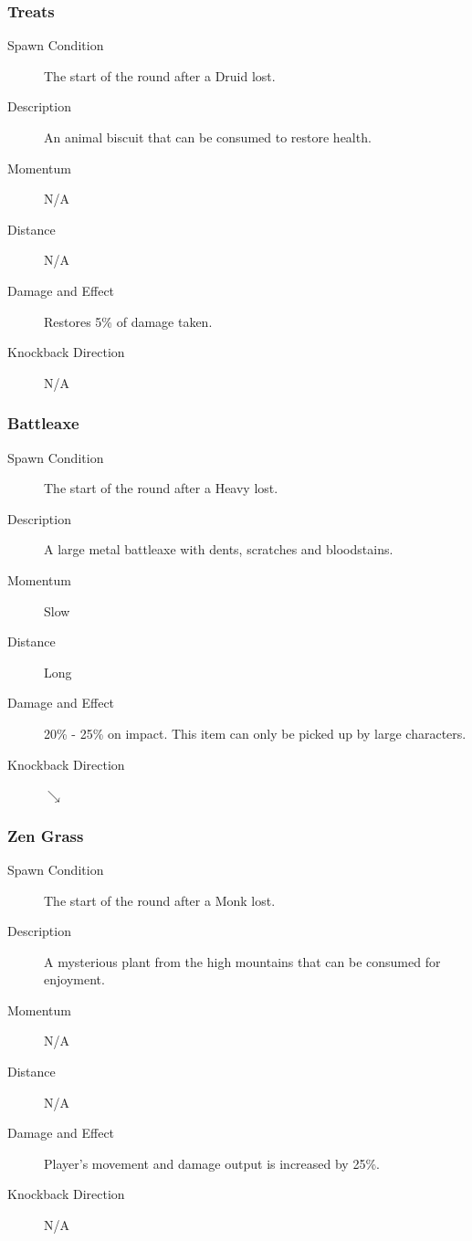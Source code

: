 \noindent\hrulefill

\subsubsection{Treats}

\begin{description}
    \item[Spawn Condition] The start of the round after a Druid lost.
    \item[Description] An animal biscuit that can be consumed to restore health.
    \item[Momentum] N/A
    \item[Distance] N/A
    \item[Damage and Effect] Restores 5\% of damage taken.
    \item[Knockback Direction] N/A
\end{description}

\noindent\hrulefill

\subsubsection{Battleaxe}

\begin{description}
    \item[Spawn Condition] The start of the round after a Heavy lost.
    \item[Description] A large metal battleaxe with dents, scratches and bloodstains.
    \item[Momentum] Slow
    \item[Distance] Long
    \item[Damage and Effect] 20\% - 25\% on impact. This item can only be picked up by large characters.
    \item[Knockback Direction] $\searrow$
\end{description}

\noindent\hrulefill

\subsubsection{Zen Grass}

\begin{description}
    \item[Spawn Condition] The start of the round after a Monk lost.
    \item[Description] A mysterious plant from the high mountains that can be consumed for enjoyment.
    \item[Momentum] N/A
    \item[Distance] N/A
    \item[Damage and Effect] Player's movement and damage output is increased by 25\%.
    \item[Knockback Direction] N/A
\end{description}

